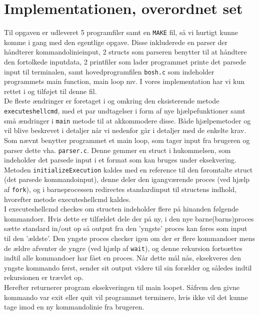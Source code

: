 \documentclass[final]{article}
\begin{document}
\section{Implementationen, overordnet set}
Til opgaven er udleveret 5 programfiler samt en \texttt{MAKE} fil, så vi hurtigt kunne komme i gang med den egentlige opgave. Disse inkluderede en parser der håndterer kommandolinieinput, 2 structs som parseren benytter til at håndtere den fortolkede inputdata, 2 printfiler som lader programmet printe det parsede input til terminalen, samt hovedprogramfilen \texttt{bosh.c} som indeholder programmets main function, main loop mv. I vores implementation har vi kun rettet i og tilføjet til denne fil.\\

De fleste ændringer er foretaget i og omkring den eksisterende metode \texttt{executeshellcmd}, med et par undtagelser i form af nye hjælpefunktioner samt små ændringer i \texttt{main} metode til at akkommodere disse. Både hjælpemetoder og vil blive beskrevet i detaljer når vi nedenfor går i detaljer med de enkelte krav.\\

Som nævnt benytter programmet et main loop, som tager input fra brugeren og parser dette vha. \texttt{parser.c}. Denne gemmer en struct i hukommelsen, som indeholder det parsede input i et format som kan bruges under eksekvering. Metoden \texttt{initializeExecution} kaldes med en reference til den føromtalte struct (det parsede kommandoinput), denne deler den igangværende proces (ved hjælp af \texttt{fork}), og i barneprocessen redirectes standardinput til structens indhold, hvorefter metode executeshellcmd kaldes.\\

I executeshellcmd checkes om structen indeholder flere på hinanden følgende kommandoer. Hvis dette er tilfældet dele der på ny, i den nye barne(barns)proces sætte standard in/out op så output fra den 'yngste' proces kan føres som input til den 'ældste'. Den yngste proces checker igen om der er flere kommandoer mens de ældre afventer de yngre (ved hjælp af \texttt{wait}), og denne rekursion fortsættes indtil alle kommandoer har fået en proces. Når dette mål nås, eksekveres den yngste kommando først, sender sit output videre til sin forælder og således indtil rekursionen er trævlet op.\\

Herefter returnerer program eksekveringen til main loopet. Såfrem den givne kommando var exit eller quit vil programmet terminere, hvis ikke vil det kunne tage imod en ny kommandolinie fra brugeren.\\
\end{document}
